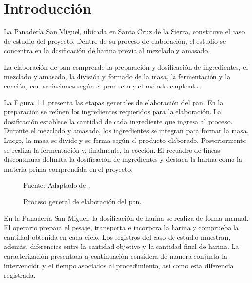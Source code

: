 \raggedbottom

\chapter{Introducción}
\label{sec:introduction}

La Panadería San Miguel, ubicada en Santa Cruz de la Sierra, constituye
el caso de estudio del proyecto. Dentro de su proceso de elaboración,
el estudio se concentra en la dosificación de harina previa al mezclado
y amasado.

La elaboración de pan comprende la preparación y dosificación de
ingredientes, el mezclado y amasado, la división y formado de la masa,
la fermentación y la cocción, con variaciones según el producto y el
método empleado \parencite{cauvain2015technology}.

La Figura~\ref{fig:proceso_general_pan} presenta las etapas generales de
elaboración del pan. En la preparación se reúnen los ingredientes requeridos
para la elaboración. La dosificación establece la cantidad de cada ingrediente
que ingresa al proceso. Durante el mezclado y amasado, los ingredientes se
integran para formar la masa. Luego, la masa se divide y se forma según el
producto elaborado. Posteriormente se realiza la fermentación y, finalmente,
la cocción. El recuadro de líneas discontinuas delimita la dosificación de
ingredientes y destaca la harina como la materia prima comprendida en el
proyecto.

\begin{figure}[htb]
    \centering

    \resizebox{0.95\textwidth}{!}{%
        {\setlength{\fboxsep}{10pt}
        \fbox{%
            
        }}
    }

    \caption{Proceso general de elaboración del pan.}
    \label{fig:proceso_general_pan}

    \vspace{0.2em}
    {\footnotesize Fuente: Adaptado de \textcite{lim2019spc}.}

\end{figure}

En la Panadería San Miguel, la dosificación de harina se realiza de forma
manual. El operario prepara el pesaje, transporta e incorpora la harina y
comprueba la cantidad obtenida en cada ciclo. Los registros del caso de
estudio muestran, además, diferencias entre la cantidad objetivo y la
cantidad final de harina. La caracterización presentada a continuación
considera de manera conjunta la intervención y el tiempo asociados al
procedimiento, así como esta diferencia registrada.

